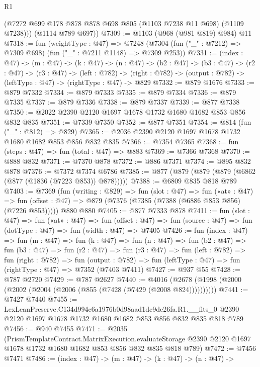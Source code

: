 \begin{lexlean}{R1}
\begin{coremodule}
        (@7272 @699 @178 @878 @878 @698 @805 (@1103 @7238 @11 @698) (@1109 @7238)))
      (@1114 @789 @697))
@7309 := @1103 (@968 (@981 @819) @984) @11
@7318 := fun (weightType : @47) =>
  @7248 (@7304 (fun ("_" : @7212) => @7309 @698) (fun ("_" : @7211 @1148) => @7309 @253))
@7331 := (index : @47) ->
  (m : @47) ->
  (k : @47) ->
  (n : @47) ->
  (b2 : @47) ->
  (b3 : @47) ->
  (r2 : @47) ->
  (r3 : @47) ->
  (left : @782) ->
  (right : @782) -> (output : @782) -> (leftType : @47) -> (rightType : @47) -> @829
@7332 := @879 @1676
@7333 := @879 @7332
@7334 := @879 @7333
@7335 := @879 @7334
@7336 := @879 @7335
@7337 := @879 @7336
@7338 := @879 @7337
@7339 := @877 @7338
@7350 := @2022 @2390 @2120 @1697 @1678 @1732 @1680 @1682 @853 @856 @832 @835
@7351 := @7339 @7350
@7352 := @877 @7351
@7354 := @814 (fun ("_" : @812) => @829)
@7365 := @2036 @2390 @2120 @1697 @1678 @1732 @1680 @1682 @853 @856 @832 @835
@7366 := @7354 @7365
@7368 := fun (steps : @47) => fun (total : @47) => @883
@7369 := @7366 @7368
@7370 := @888 @832
@7371 := @7370 @878
@7372 := @886 @7371
@7374 := @895 @832 @878
@7376 := @7372 @7374 @6786
@7385 := @877 (@879 (@879 (@879 (@6862 (@877 (@1836 (@7223 @853)) @878)))))
@7388 := @6809 @835 @818 @789
@7403 := @7369
    (fun (writing : @829) =>
    fun (slot : @47) =>
    fun («at» : @47) =>
    fun (offset : @47) => @879 (@7376 (@7385 (@7388 (@6886 @853 @856) (@7226 @853)))))
    @880
    @880
@7405 := @877 @7333 @878
@7411 := fun (slot : @47) =>
  fun («at» : @47) =>
  fun (offset : @47) => fun (source : @47) => fun (dotType : @47) => fun (width : @47) => @7405
@7426 := fun (index : @47) =>
  fun (m : @47) =>
  fun (k : @47) =>
  fun (n : @47) =>
  fun (b2 : @47) =>
  fun (b3 : @47) =>
  fun (r2 : @47) =>
  fun (r3 : @47) =>
  fun (left : @782) =>
  fun (right : @782) =>
  fun (output : @782) => fun (leftType : @47) => fun (rightType : @47) => @7352 (@7403 @7411)
@7427 := @937 @55
@7428 := @787 @2720
@7429 := @787 @2627
@7440 := @4016 (@2678 (@1998 (@2000 (@2002 (@2004 (@2006 (@855 (@7428 (@7429 (@2008 @824))))))))))
@7441 := @7427 @7440
@7455 := LexLeanPreserve.C134d994c6a1976b0d98aad1dc9de26fa.R1.__fits_0
    @2390
    @2120
    @1697
    @1678
    @1732
    @1680
    @1682
    @853
    @856
    @832
    @835
    @818
    @789
@7456 := @940 @7455
@7471 := @2035
    (PrismTemplateContract.MatrixExecution.evaluateStorage
      @2390
      @2120
      @1697
      @1678
      @1732
      @1680
      @1682
      @853
      @856
      @832
      @835
      @818
      @789)
@7472 := @7456 @7471
@7486 := (index : @47) ->
  (m : @47) ->
  (k : @47) ->
  (n : @47) ->

\end{coremodule}
\end{lexlean}
